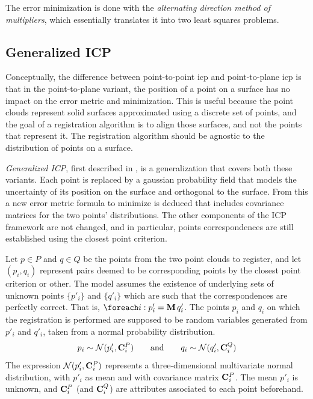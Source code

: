 The error minimization is done with the \emph{alternating direction method of multipliers}, which essentially translates it into two least squares problems.



\subsection{Generalized ICP}
Conceptually, the difference between point-to-point \gls{icp} and point-to-plane \gls{icp} is that in the point-to-plane variant, the position of a point on a surface has no impact on the error metric and minimization. This is useful because the point clouds represent solid surfaces approximated using a discrete set of points, and the goal of a registration algorithm is to align those surfaces, and not the points that represent it. The registration algorithm should be agnostic to the distribution of points on a surface.

\emph{Generalized ICP}, first described in \cite{Sega2009}, is a generalization that covers both these variants. Each point is replaced by a gaussian probability field that models the uncertainty of its position on the surface and orthogonal to the surface. From this a new error metric formula to minimize is deduced that includes covariance matrices for the two points' distributions. The other components of the ICP framework are not changed, and in particular, points correspondences are still established using the closest point criterion.

Let $p \in P$ and $q \in Q$ be the points from the two point clouds to register, and let $(p_i, q_i)$ represent pairs deemed to be corresponding points by the closest point criterion or other. The model assumes the existence of underlying sets of unknown points $\{ p'_i \}$ and $\{ q'_i \}$ which are such that the correspondences are perfectly correct. That is, $\foreach i : p'_i = \matr{M} \, q'_i$. The points $p_i$ and $q_i$ on which the registration is performed are supposed to be random variables generated from $p'_i$ and $q'_i$, taken from a normal probability distribution.
\begin{equation}
p_i \sim \mathcal{N}(p'_i, \mathbf{C}^{P}_i)
\hspace{7mm} \text{and} \hspace{7mm}
q_i \sim \mathcal{N}(q'_i, \mathbf{C}^{Q}_i)
\end{equation}
The expression $\mathcal{N}(p'_i, \mathbf{C}^{P}_i)$ represents a three-dimensional multivariate normal distribution, with $p'_i$ as mean and with covariance matrix $\mathbf{C}^{P}_i$. The mean $p'_i$ is unknown, and $\mathbf{C}^{P}_i$ (and $\mathbf{C}^{Q}_i$) are attributes associated to each point beforehand.

